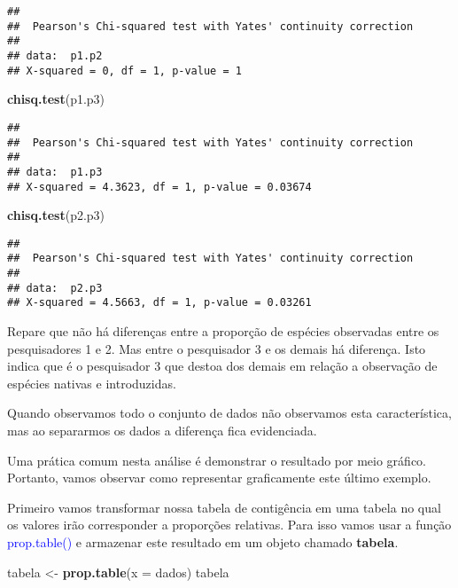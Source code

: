 \documentclass[14pt,titlepage, oneside, openany, a4paper]{book}
\newenvironment{Shaded}{\begin{snugshade}}{\end{snugshade}}
\newcommand{\DataTypeTok}[1]{\textcolor[rgb]{0.13,0.29,0.53}{#1}}
\newcommand{\KeywordTok}[1]{\textcolor[rgb]{0.13,0.29,0.53}{\textbf{#1}}}
\newcommand{\NormalTok}[1]{#1}
\newcommand{\StringTok}[1]{\textcolor[rgb]{0.31,0.60,0.02}{#1}}
\begin{document}
\begin{verbatim}
## 
##  Pearson's Chi-squared test with Yates' continuity correction
## 
## data:  p1.p2
## X-squared = 0, df = 1, p-value = 1
\end{verbatim}

\begin{Shaded}
\begin{Highlighting}[]
\KeywordTok{chisq.test}\NormalTok{(p1.p3)}
\end{Highlighting}
\end{Shaded}

\begin{verbatim}
## 
##  Pearson's Chi-squared test with Yates' continuity correction
## 
## data:  p1.p3
## X-squared = 4.3623, df = 1, p-value = 0.03674
\end{verbatim}

\begin{Shaded}
\begin{Highlighting}[]
\KeywordTok{chisq.test}\NormalTok{(p2.p3)}
\end{Highlighting}
\end{Shaded}

\begin{verbatim}
## 
##  Pearson's Chi-squared test with Yates' continuity correction
## 
## data:  p2.p3
## X-squared = 4.5663, df = 1, p-value = 0.03261
\end{verbatim}

Repare que não há diferenças entre a proporção de espécies observadas entre os pesquisadores 1 e 2. Mas entre o pesquisador 3 e os demais há diferença. Isto indica que é o pesquisador 3 que destoa dos demais em relação a observação de espécies nativas e introduzidas.

Quando observamos todo o conjunto de dados não observamos esta característica, mas ao separarmos os dados a diferença fica evidenciada.

Uma prática comum nesta análise é demonstrar o resultado por meio gráfico. Portanto, vamos observar como representar graficamente este último exemplo.

Primeiro vamos transformar nossa tabela de contigência em uma tabela no qual os valores irão corresponder a proporções relativas. Para isso vamos usar a função \textcolor{blue}{prop.table()} e armazenar este resultado em um objeto chamado \textbf{tabela}.

\begin{Shaded}
\begin{Highlighting}[]
\NormalTok{tabela <-}\StringTok{ }\KeywordTok{prop.table}\NormalTok{(}\DataTypeTok{x =}\NormalTok{ dados)}
\NormalTok{tabela}
\end{Highlighting}
\end{Shaded}
\end{document}
